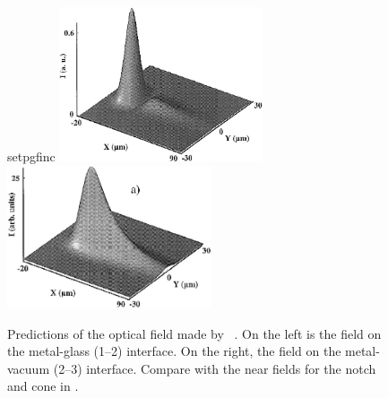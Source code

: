 \begin{figure}[ht]
  \centering
  {setpgfinc}
  \includegraphics[keepaspectratio,width=6cm]{interference/figures/BaidaReflected.jpg}
  \hspace{1cm}
  \includegraphics[keepaspectratio,width=6cm]{interference/figures/BaidaTransmitted.jpg}
  \caption{Predictions of the optical field made by
    ~\cite{baida1999theoretical}.  On the left is the field on
    the metal-glass (1--2) interface.  On the right, the field on the
    metal-vacuum (2--3) interface.  Compare with the near fields for the
    notch and cone in .}\label{fig:baidacompare}
\end{figure}

